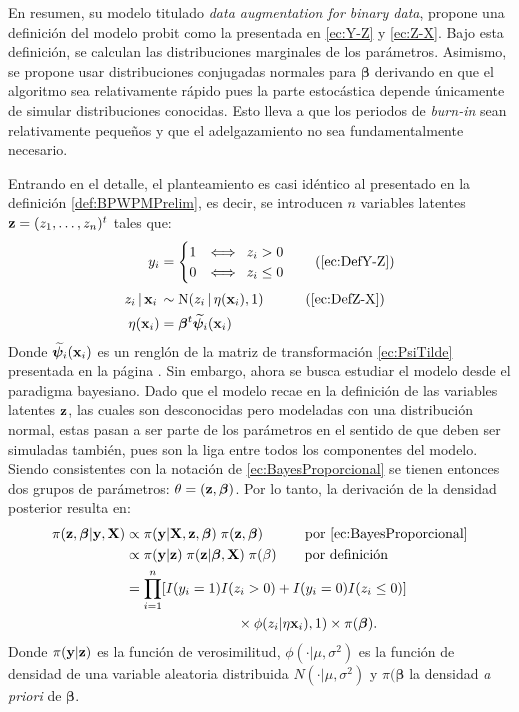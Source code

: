 \documentclass[../Main/Main.tex]{subfiles}
\begin{document}
En resumen, su modelo titulado \textit{data augmentation for binary data}, propone una definición del modelo probit como la presentada en \eqref{ec:Y-Z} y \eqref{ec:Z-X}. Bajo esta definición, se calculan las distribuciones marginales de los parámetros. Asimismo, se propone usar distribuciones conjugadas normales para $\bm{\beta}$ derivando en que el algoritmo sea relativamente rápido pues la parte estocástica depende únicamente de simular distribuciones conocidas. Esto lleva a que los periodos de \textit{burn-in} sean relativamente pequeños y que el adelgazamiento no sea fundamentalmente necesario.

Entrando en el detalle, el planteamiento es casi idéntico al presentado en la definición \ref{def:BPWPMPrelim}, es decir, se introducen $n$ variables latentes $\mathbf{z} = (z_1,\ldots,z_n)^t$ tales que:
\begin{align}
y_i &= 
	\begin{cases}
		1 & \Longleftrightarrow \enspace z_i > 0 \\									0 & \Longleftrightarrow \enspace z_i \leq 0
	\end{cases} \tag{\ref{ec:DefY-Z}} \\[2pt]
z_i\,|\,\xni\, &\sim \text{N}(z_i\,|\,\eta(\xni),1)\quad \tag{\ref{ec:DefZ-X}}  \\
	\eta(\xni) &= \bm{\beta}^t\xnpsi \label{ec:EtaFinal}
\end{align}
Donde $\widetilde{\bm{\psi}}_i(\mathbf{x}_i)$ es un renglón de la matriz de transformación \eqref{ec:PsiTilde} presentada en la página \pageref{ec:PsiTilde}.
Sin embargo, ahora se busca estudiar el modelo desde el paradigma bayesiano. Dado que el modelo recae en la definición de las variables latentes $\mathbf{z}$, las cuales son desconocidas pero modeladas con una distribución normal, estas pasan a ser parte de los parámetros en el sentido de que deben ser simuladas también, pues son la liga entre todos los componentes del modelo. Siendo consistentes con la notación de \eqref{ec:BayesProporcional} se tienen entonces dos grupos de parámetros:  $\theta = (\mathbf{z}, \bm{\beta})$. Por lo tanto, la derivación de la densidad posterior resulta en:
\begin{align}
	\pi(\mathbf{z}, \bm{\beta}| \mathbf{y}, \mathbf{X})
		& \propto \pi(\mathbf{y} | \mathbf{X}, \mathbf{z}, \bm{\beta}) 
		\; \pi(\mathbf{z}, \bm{\beta}) \quad\qquad\text{por \eqref{ec:BayesProporcional}}\nonumber \\
	& \propto \pi(\mathbf{y} | \mathbf{z})\; \pi(\mathbf{z}|\bm{\beta},\mathbf{X}) 
		\; \pi(\beta) \qquad\text{por definición} \nonumber \\
	& = \prod_{i = 1}^n[I(y_i = 1)I(z_i > 0) +
		 I(y_i = 0)I(z_i \leq 0)] \nonumber \\
		 &\qquad\qquad\qquad\qquad\times \phi(z_i|\eta{\mathbf{x}_i)},1) 				\times \pi(\bm{\beta}). \label{ec:BayesChibbPosterior}
\end{align}
Donde $\pi(\mathbf{y} | \mathbf{z})$ es la función de verosimilitud, $\phi(\cdot|\mu,\sigma^2)$ es la función de densidad de una variable aleatoria distribuida $N(\cdot|\mu,\sigma^2)$ y $\pi(\bm{\beta}$ la densidad \textit{a priori} de $\bm{\beta}$.
\end{document}

